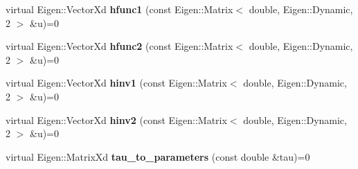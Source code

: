 \begin{DoxyCompactItemize}
\item 
\hypertarget{classvinecopulib_1_1_abstract_bicop_a2dece0c5a4690e18e8407ea9078522fd}{virtual Eigen\+::\+Vector\+Xd {\bfseries hfunc1} (const Eigen\+::\+Matrix$<$ double, Eigen\+::\+Dynamic, 2 $>$ \&u)=0}\label{classvinecopulib_1_1_abstract_bicop_a2dece0c5a4690e18e8407ea9078522fd}

\item 
\hypertarget{classvinecopulib_1_1_abstract_bicop_a604690344660208cbf7a14aed322d0c6}{virtual Eigen\+::\+Vector\+Xd {\bfseries hfunc2} (const Eigen\+::\+Matrix$<$ double, Eigen\+::\+Dynamic, 2 $>$ \&u)=0}\label{classvinecopulib_1_1_abstract_bicop_a604690344660208cbf7a14aed322d0c6}

\item 
\hypertarget{classvinecopulib_1_1_abstract_bicop_a4638c25e1dbb34288b65bcc9f1f6f04e}{virtual Eigen\+::\+Vector\+Xd {\bfseries hinv1} (const Eigen\+::\+Matrix$<$ double, Eigen\+::\+Dynamic, 2 $>$ \&u)=0}\label{classvinecopulib_1_1_abstract_bicop_a4638c25e1dbb34288b65bcc9f1f6f04e}

\item 
\hypertarget{classvinecopulib_1_1_abstract_bicop_a945d782285a9d11a59795e894e8c216b}{virtual Eigen\+::\+Vector\+Xd {\bfseries hinv2} (const Eigen\+::\+Matrix$<$ double, Eigen\+::\+Dynamic, 2 $>$ \&u)=0}\label{classvinecopulib_1_1_abstract_bicop_a945d782285a9d11a59795e894e8c216b}

\item 
\hypertarget{classvinecopulib_1_1_abstract_bicop_a48fc84b668c515745754bfe33ab7cbcf}{virtual Eigen\+::\+Matrix\+Xd {\bfseries tau\+\_\+to\+\_\+parameters} (const double \&tau)=0}\label{classvinecopulib_1_1_abstract_bicop_a48fc84b668c515745754bfe33ab7cbcf}

\end{DoxyCompactItemize}
{\bf }\par
